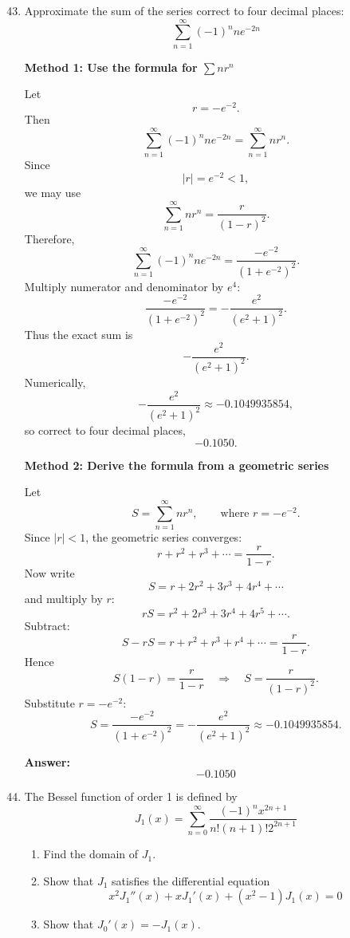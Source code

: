 \documentclass[a4paper,12pt,twocolumn]{article}
\newenvironment{solutionbox}{\begin{framed}}{\end{framed}}
\begin{document}
\begin{enumerate}[label=\textbf{\arabic*.}, leftmargin=2em, itemsep=1.2em]
\setcounter{enumi}{42}
\item Approximate the sum of the series correct to four decimal places:
\[
\sum_{n=1}^{\infty} (-1)^n n e^{-2n}
\]

\begin{solutionbox}
\textbf{Method 1: Use the formula for \(\sum nr^n\)}

Let
\[
r=-e^{-2}.
\]
Then
\[
\sum_{n=1}^{\infty} (-1)^n n e^{-2n}
=
\sum_{n=1}^{\infty} nr^n.
\]
Since
\[
|r|=e^{-2}<1,
\]
we may use
\[
\sum_{n=1}^{\infty} nr^n=\frac{r}{(1-r)^2}.
\]
Therefore,
\[
\sum_{n=1}^{\infty} (-1)^n n e^{-2n}
=
\frac{-e^{-2}}{(1+e^{-2})^2}.
\]
Multiply numerator and denominator by \(e^4\):
\[
\frac{-e^{-2}}{(1+e^{-2})^2}
=
-\frac{e^2}{(e^2+1)^2}.
\]
Thus the exact sum is
\[
-\frac{e^2}{(e^2+1)^2}.
\]
Numerically,
\[
-\frac{e^2}{(e^2+1)^2}\approx -0.1049935854,
\]
so correct to four decimal places,
\[
\boxed{-0.1050}.
\]
\end{solutionbox}

\begin{solutionbox}
\textbf{Method 2: Derive the formula from a geometric series}

Let
\[
S=\sum_{n=1}^{\infty} nr^n,
\qquad \text{where } r=-e^{-2}.
\]
Since \(|r|<1\), the geometric series converges:
\[
r+r^2+r^3+\cdots=\frac{r}{1-r}.
\]
Now write
\[
S=r+2r^2+3r^3+4r^4+\cdots
\]
and multiply by \(r\):
\[
rS=r^2+2r^3+3r^4+4r^5+\cdots.
\]
Subtract:
\[
S-rS=r+r^2+r^3+r^4+\cdots=\frac{r}{1-r}.
\]
Hence
\[
S(1-r)=\frac{r}{1-r}
\quad\Longrightarrow\quad
S=\frac{r}{(1-r)^2}.
\]
Substitute \(r=-e^{-2}\):
\[
S=\frac{-e^{-2}}{(1+e^{-2})^2}
=
-\frac{e^2}{(e^2+1)^2}
\approx -0.1049935854.
\]

\medskip
\textbf{Answer:}
\[
\boxed{-0.1050}
\]
\end{solutionbox}

\setcounter{enumi}{39}
\item The Bessel function of order 1 is defined by
\[
J_1(x)=\sum_{n=0}^{\infty}\frac{(-1)^n x^{2n+1}}{n!(n+1)!2^{2n+1}}
\]
\begin{enumerate}[label=(\alph*), leftmargin=2em]
\item Find the domain of \(J_1\).
\item Show that \(J_1\) satisfies the differential equation
\[
x^2 J_1''(x)+x J_1'(x)+(x^2-1)J_1(x)=0
\]
\item Show that \(J_0'(x)=-J_1(x)\).
\end{enumerate}


\end{enumerate}
\end{document}
